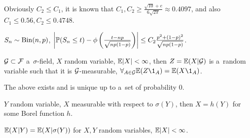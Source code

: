 	\begin{remark}
		Obviously $C_2 \leq C_1$, it is known that
		$C_1, C_2 \geq \frac{\sqrt{10}+e}{6 \sqrt{2\pi}} \approx 0.4097$,
		and also ${C_1 \leq 0.56, C_2 \leq 0.4748}$.
	\end{remark}
	
	\begin{example}
		$S_n \sim \mr{Bin}(n,p)$,
		$\left|\P(S_n \leq t) - \phi\left(\frac{t - np}{\sqrt{n p (1-p)}} \right) 
		\right| \leq C_2 \frac{p^2 + (1-p)^2}{\sqrt{np(1-p)}}$.
	\end{example}
	
	\begin{definition}
		$\G \subset \F$ a~$\sigma$-field, $X$ random variable, $\E |X|<\infty$,
		then $Z=\E(X|\G)$ is a~random variable such that
		it is $\G$-measurable, $\forall_{A \in \G} \E(Z \1_A) = \E(X \1_A)$.
	\end{definition}
	
	\begin{proposition}
		The above exists and is unique up to a~set of probability 0.
	\end{proposition}

	
	\begin{proposition}
		$Y$ random variable, $X$ measurable with respect to $\sigma(Y)$,
		then $X=h(Y)$ for some Borel function $h$.
	\end{proposition}
	
	\begin{definition}
		$\E(X|Y) = \E(X | \sigma(Y))$ for $X, Y$ random variables, $\E |X|<\infty$.
	\end{definition}



	
	

 
 
